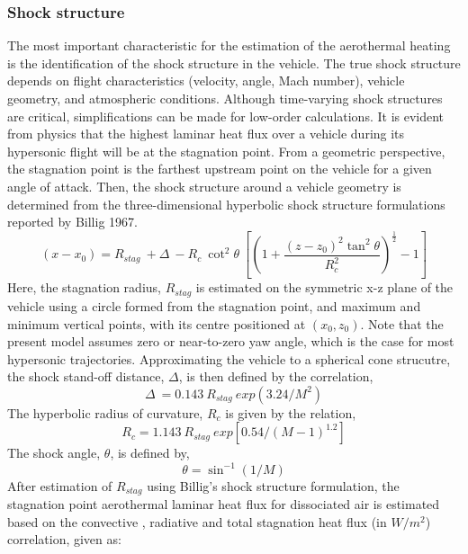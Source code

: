 \documentclass[%
 aip,
 amsmath,amssymb,
preprint,%
]{revtex4-1}
\begin{document}
\subsubsection{Shock structure}
The most important characteristic for the estimation of the aerothermal heating is the identification of the shock structure in the vehicle. The true shock structure depends on flight characteristics (velocity, angle, Mach number), vehicle geometry, and atmospheric conditions. Although time-varying shock structures are critical, simplifications can be made for low-order calculations. 
It is evident from physics that the highest laminar heat flux over a vehicle during its hypersonic flight will be at the stagnation point. From a geometric perspective, the stagnation point is the farthest upstream point on the vehicle for a given angle of attack. Then, the shock structure around a vehicle geometry is determined from the three-dimensional hyperbolic shock structure formulations reported by Billig 1967. 
\begin{equation}
    (x-x_0) = R_{stag}~ + \Delta~ - R_c~\cot^{2}\theta~\left[\left(1+\frac{(z-z_{0})^{2}\tan^{2}\theta}{R_{c} ^{2}}\right)^{\frac{1}{2}} - 1\right]
    \label{shock_structure}
\end{equation}
Here, the stagnation radius, $ R_{stag}$ is estimated on the symmetric x-z plane of the vehicle using a circle formed from the stagnation point, and maximum and minimum vertical points, with its centre positioned at $(x_{0},z_{0})$. Note that the present model assumes zero or near-to-zero yaw angle, which is the case for most hypersonic trajectories. Approximating the vehicle to a spherical cone strucutre, the shock stand-off distance, $\Delta$, is then defined by the correlation,
\begin{equation}
    \Delta~ = 0.143~ R_{stag}~ exp\left(3.24/M^{2}\right)
\end{equation}
The hyperbolic radius of curvature, $R_{c}$ is given by the relation,
\begin{equation}
    R_{c} = 1.143~ R_{stag}~ exp\left[0.54/\left(M-1\right)^{1.2}\right]
\end{equation}
The shock angle, $\theta$, is defined by,
\begin{equation}
    \theta = \sin^{-1}\left(1/M\right)
\end{equation}
After estimation of $R_{stag}$ using Billig's shock structure formulation, the stagnation point aerothermal laminar heat flux for dissociated air is estimated based on the convective \citep{detra_generalized_1961, hirschel_thermal_2015}, radiative  \citep{hirschel_thermal_2015} and total stagnation heat flux (in $W/m^{2}$) correlation, given as:
\end{document}
